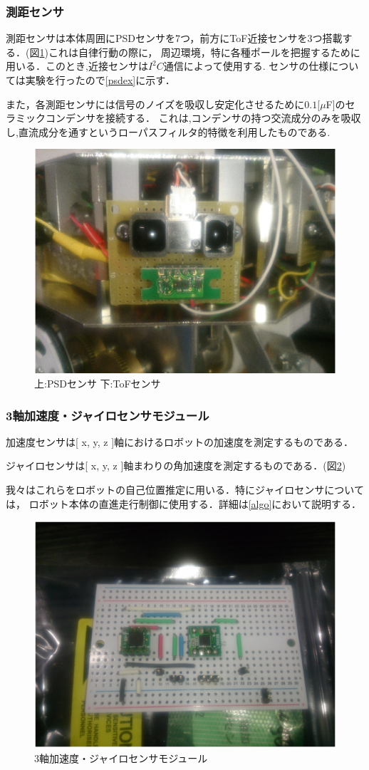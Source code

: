 \subsubsection{測距センサ}  
測距センサは本体周囲にPSDセンサを7つ，前方にToF近接センサを3つ搭載する．(図\ref{Distance})これは自律行動の際に，
周辺環境，特に各種ポールを把握するために用いる．このとき,近接センサは$I^2 C$通信によって使用する.
センサの仕様については実験を行ったので\ref{psdex}に示す．

また，各測距センサには信号のノイズを吸収し安定化させるために$0.1[\mu $F]のセラミックコンデンサを接続する．
これは,コンデンサの持つ交流成分のみを吸収し,直流成分を通すというローパスフィルタ的特徴を利用したものである.

\begin{figure}[b]
 \centering
 \includegraphics[width=0.5\hsize]{../kakeru/picture/Distance.eps}
    \caption{上:PSDセンサ 下:ToFセンサ}
    \label{Distance}
\end{figure}
\subsubsection{3軸加速度・ジャイロセンサモジュール}
加速度センサは[ x, y, z ]軸におけるロボットの加速度を測定するものである．

ジャイロセンサは[ x, y, z ]軸まわりの角加速度を測定するものである．(図\ref{jairo})

我々はこれらをロボットの自己位置推定に用いる．特にジャイロセンサについては，
ロボット本体の直進走行制御に使用する．詳細は\ref{algo}において説明する．
\begin{figure}[t]
 \centering
 \includegraphics[width=0.4\hsize]{../kakeru/picture/jairo.eps}
    \caption{3軸加速度・ジャイロセンサモジュール}
    \label{jairo}
\end{figure}
